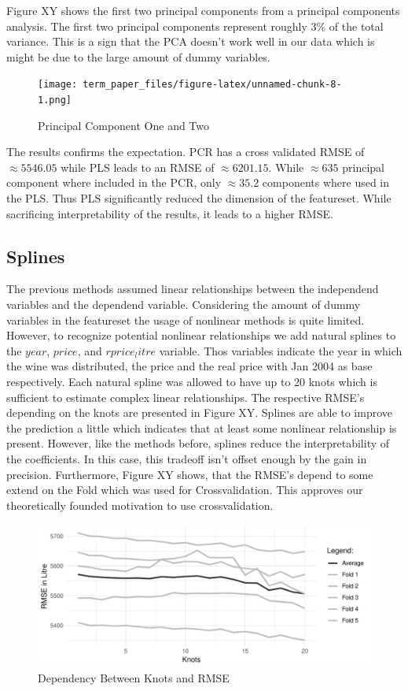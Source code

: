 \documentclass[11pt,]{article}
\begin{document}
Figure XY shows the first two principal components from a principal
components analysis. The first two principal components represent
roughly 3\% of the total variance. This is a sign that the PCA doesn't
work well in our data which is might be due to the large amount of dummy
variables.

\begin{figure}
\centering
\texttt{[image: term\_paper\_files/figure-latex/unnamed-chunk-8-1.png]}
\caption{Principal Component One and Two}
\end{figure}

The results confirms the expectation. PCR has a cross validated RMSE of
\(\approx 5546.05\) while PLS leads to an RMSE of \(\approx 6201.15\).
While \(\approx 635\) principal component where included in the PCR,
only \(\approx 35.2\) components where used in the PLS. Thus PLS
significantly reduced the dimension of the featureset. While sacrificing
interpretability of the results, it leads to a higher RMSE.

\hypertarget{splines}{%
\subsection{Splines}\label{splines}}

The previous methods assumed linear relationships between the
independend variables and the dependend variable. Considering the amount
of dummy variables in the featureset the usage of nonlinear methods is
quite limited. However, to recognize potential nonlinear relationships
we add natural splines to the \(year\), \(price\), and \(rprice_litre\)
variable. Thos variables indicate the year in which the wine was
distributed, the price and the real price with Jan 2004 as base
respectively. Each natural spline was allowed to have up to 20 knots
which is sufficient to estimate complex linear relationships. The
respective RMSE's depending on the knots are presented in Figure XY.
Splines are able to improve the prediction a little which indicates that
at least some nonlinear relationship is present. However, like the
methods before, splines reduce the interpretability of the coefficients.
In this case, this tradeoff isn't offset enough by the gain in
precision. Furthermore, Figure XY shows, that the RMSE's depend to some
extend on the Fold which was used for Crossvalidation. This approves our
theoretically founded motivation to use crossvalidation.

\begin{figure}
\centering
\includegraphics{../00_data/output_paper/08_splines.pdf}
\caption{Dependency Between Knots and RMSE}
\end{figure}
\end{document}
